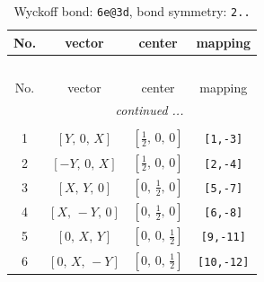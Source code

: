 \documentclass[fleqn,8pt]{jsarticle}
\begin{document}
\renewcommand{\arraystretch}{1.2}
\begin{longtable}{cccc}
\caption{Wyckoff bond: {\tt 6e@3d}, bond symmetry: {\tt 2..}}
 \\
 \hline \hline
No. & vector & center & mapping \\ \hline \endfirsthead

\multicolumn{3}{l}{\tablename\ \thetable{}} \\
 \hline \hline
No. & vector & center & mapping \\ \hline \endhead

 \hline \hline
\multicolumn{3}{r}{\footnotesize\it continued ...} \\ \endfoot

 \hline \hline
\multicolumn{3}{r}{} \\ \endlastfoot

1 & $\left[ Y,\, 0,\, X \right]$ & $\left[ \frac{1}{2},\, 0,\, 0 \right]$ & {\tt [1,-3]} \\ \hline
2 & $\left[ - Y,\, 0,\, X \right]$ & $\left[ \frac{1}{2},\, 0,\, 0 \right]$ & {\tt [2,-4]} \\ \hline
3 & $\left[ X,\, Y,\, 0 \right]$ & $\left[ 0,\, \frac{1}{2},\, 0 \right]$ & {\tt [5,-7]} \\ \hline
4 & $\left[ X,\, - Y,\, 0 \right]$ & $\left[ 0,\, \frac{1}{2},\, 0 \right]$ & {\tt [6,-8]} \\ \hline
5 & $\left[ 0,\, X,\, Y \right]$ & $\left[ 0,\, 0,\, \frac{1}{2} \right]$ & {\tt [9,-11]} \\ \hline
6 & $\left[ 0,\, X,\, - Y \right]$ & $\left[ 0,\, 0,\, \frac{1}{2} \right]$ & {\tt [10,-12]} \\
\end{longtable}
\renewcommand{\arraystretch}{1.2}
\end{document}
